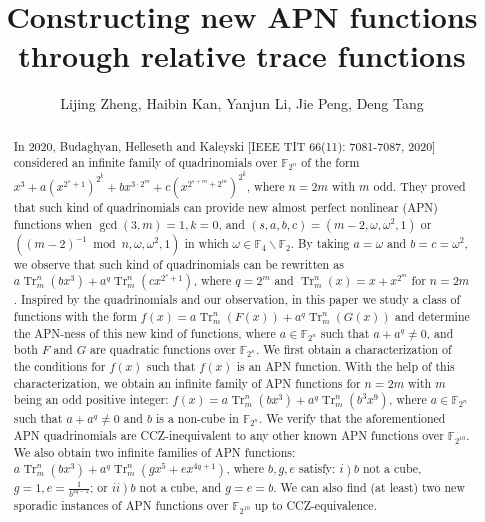 \documentclass[10pt]{article}
\title{Constructing new APN functions through relative trace functions }
\author{Lijing Zheng, Haibin Kan, Yanjun Li, Jie Peng, Deng Tang}
\date{}
\begin{document}
\maketitle
\captionsetup{singlelinecheck=false}


\begin{abstract}
In 2020, Budaghyan, Helleseth and Kaleyski [IEEE TIT 66(11): 7081-7087, 2020] considered an infinite family of quadrinomials over $\mathbb{F}_{2^{n}}$ of the form $x^{3}+a\left(x^{2^{s}+1}\right)^{2^{k}}+b x^{3 \cdot 2^{m}}+c\left(x^{2^{s+m}+2^{m}}\right)^{2^{k}}$, where $n=2 m$ with $m$ odd. They proved that such kind of quadrinomials can provide new almost perfect nonlinear (APN) functions when $\operatorname{gcd}(3, m)=1, k=0$, and $(s, a, b, c)=\left(m-2, \omega, \omega^{2}, 1\right)$ or $\left((m-2)^{-1} \bmod n, \omega, \omega^{2}, 1\right)$ in which $\omega \in \mathbb{F}_{4} \backslash \mathbb{F}_{2}$. By taking $a=\omega$ and $b=c=\omega^{2}$, we observe that such kind of quadrinomials can be rewritten as $a \operatorname{Tr}_{m}^{n}\left(b x^{3}\right)+a^{q} \operatorname{Tr}_{m}^{n}\left(c x^{2^{s}+1}\right)$, where $q=2^{m}$ and $\operatorname{Tr}_{m}^{n}(x)=x+x^{2^{m}}$ for $n=2 m$. Inspired by the quadrinomials and our observation, in this paper we study a class of functions with the form $f(x)=a \operatorname{Tr}_{m}^{n}(F(x))+a^{q} \operatorname{Tr}_{m}^{n}(G(x))$ and determine the APN-ness of this new kind of functions, where $a \in \mathbb{F}_{2^{n}}$ such that $a+a^{q} \neq 0$, and both $F$ and $G$ are quadratic functions over $\mathbb{F}_{2^{n}}$. We first obtain a characterization of the conditions for $f(x)$ such that $f(x)$ is an APN function. With the help of this characterization, we obtain an infinite family of APN functions for $n=2 m$ with $m$ being an odd positive integer: $f(x)=a \operatorname{Tr}_{m}^{n}\left(b x^{3}\right)+a^{q} \operatorname{Tr}_{m}^{n}\left(b^{3} x^{9}\right)$, where $a \in \mathbb{F}_{2^{n}}$ such that $a+a^{q} \neq 0$ and $b$ is a non-cube in $\mathbb{F}_{2^{n}}$. We verify that the aforementioned APN quadrinomials are CCZ-inequivalent to any other known APN functions over $\mathbb{F}_{2^{10}}$. We also obtain two infinite families of APN functions: $a \operatorname{Tr}_{m}^{n}\left(b x^{3}\right)+a^{q} \operatorname{Tr}_{m}^{n}\left(g x^{5}+e x^{4 q+1}\right)$, where $b, g, e$ satisfy: $\left.i\right) b$ not a cube, $g=1, e=\frac{1}{b^{2 q-2}}$; or $\left.i i\right) b$ not a cube, and $g=e=b$. We can also find (at least) two new sporadic instances of APN functions over $\mathbb{F}_{2^{10}}$ up to CCZ-equivalence.
\end{abstract}
\end{document}

